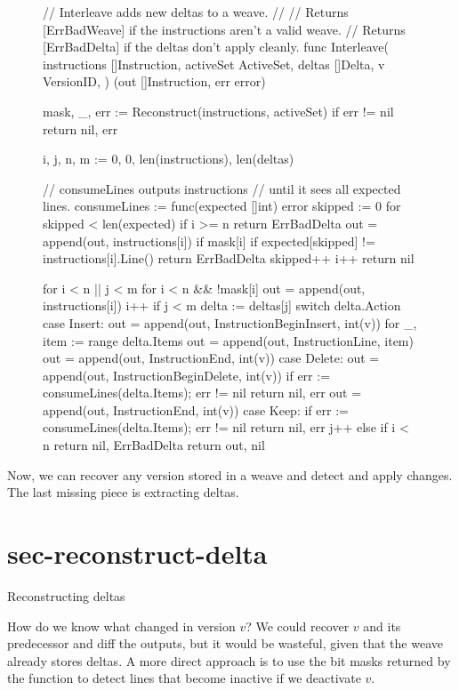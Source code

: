 \documentclass{article}
\begin{document}
\begin{figure}
\begin{code}[go]
// Interleave adds new deltas to a weave.
//
// Returns [ErrBadWeave] if the instructions aren't a valid weave.
// Returns [ErrBadDelta] if the deltas don't apply cleanly.
func Interleave(
	instructions []Instruction,
	activeSet ActiveSet,
	deltas []Delta,
	v VersionID,
) (out []Instruction, err error) {
	mask, _, err := Reconstruct(instructions, activeSet)
	if err != nil {
		return nil, err
	}

	i, j, n, m := 0, 0, len(instructions), len(deltas)

	// consumeLines outputs instructions
	// until it sees all expected lines.
	consumeLines := func(expected []int) error {
		skipped := 0
		for skipped < len(expected) {
			if i >= n {
				return ErrBadDelta
			}
			out = append(out, instructions[i])
			if mask[i] {
				if expected[skipped] != instructions[i].Line() {
					return ErrBadDelta
				}
				skipped++
			}
			i++
		}
		return nil
	}

	for i < n || j < m {
		for i < n && !mask[i] { 
			out = append(out, instructions[i])
			i++
		}
		if j < m {
			delta := deltas[j]
			switch delta.Action { 
			case Insert: 
				out = append(out, Instruction{BeginInsert, int(v)})
				for _, item := range delta.Items {
					out = append(out, Instruction{Line, item})
				}
				out = append(out, Instruction{End, int(v)})
			case Delete: 
				out = append(out, Instruction{BeginDelete, int(v)})
				if err := consumeLines(delta.Items); err != nil {
					return nil, err
				}
				out = append(out, Instruction{End, int(v)})
			case Keep: 
				if err := consumeLines(delta.Items); err != nil {
					return nil, err
				}
			}
			j++
		} else if i < n {
			return nil, ErrBadDelta
		}
	}
	return out, nil
}
\end{code}
\end{figure}

Now, we can recover any version stored in a weave
and detect and apply changes.
The last missing piece is extracting deltas.

\section{sec-reconstruct-delta}{Reconstructing deltas}

How do we know what changed in version $v$?
We could recover $v$ and its predecessor and diff the outputs,
but it would be wasteful, given that the weave already stores deltas.
A more direct approach is
to use the bit masks returned by the  function
to detect lines that become inactive if we deactivate $v$.
\end{document}
